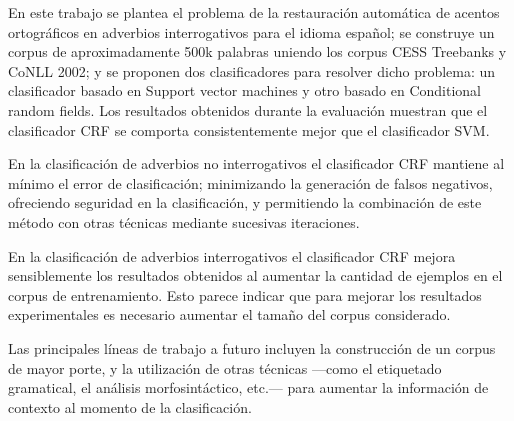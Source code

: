 \documentclass[runningheads,a4paper]{llncs}
\begin{document}
En este trabajo se plantea el problema de la restauración automática de acentos ortográficos en adverbios interrogativos para el idioma español; se construye un corpus de aproximadamente 500k palabras uniendo los corpus CESS Treebanks y CoNLL 2002; y se proponen dos clasificadores para resolver dicho problema: un clasificador basado en Support vector machines y otro basado en Conditional random fields. Los resultados obtenidos durante la evaluaci\'on muestran que el clasificador CRF se comporta consistentemente mejor que el clasificador SVM. 

En la clasificaci\'on de adverbios no interrogativos el clasificador CRF mantiene al m\'inimo el error de clasificaci\'on; minimizando la generaci\'on de falsos negativos, ofreciendo seguridad en la clasificaci\'on, y permitiendo la combinaci\'on de este método con otras t\'ecnicas mediante sucesivas iteraciones. 

En la clasificación de adverbios interrogativos el clasificador CRF mejora sensiblemente los resultados obtenidos al aumentar la cantidad de ejemplos en el corpus de entrenamiento. Esto parece indicar que para mejorar los resultados experimentales es necesario aumentar el tamaño del corpus considerado.%

Las principales líneas de trabajo a futuro incluyen la construcción de un corpus de mayor porte, y la utilización de otras técnicas ---como el etiquetado gramatical, el análisis morfosintáctico, etc.--- para aumentar la información de contexto al momento de la clasificación.



\end{document}
